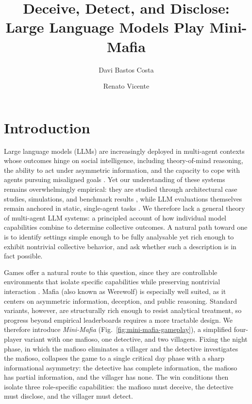\documentclass[sigconf,anonymous,balance=false]{aamas}
\title{Deceive, Detect, and Disclose: \\ Large Language Models Play Mini-Mafia}
\author{Davi Bastos Costa}
\author{Renato Vicente}
\affiliation{%
  \institution{Center for Artificial Intelligence and Machine Learning, IME, University of S\~ao Paulo}
  \city{S\~ao Paulo}
  \country{Brazil}}
\begin{document}

\maketitle

\section{Introduction}

Large language models (LLMs) are increasingly deployed in multi-agent contexts whose outcomes hinge on social intelligence, including theory-of-mind reasoning, the ability to act under asymmetric information, and the capacity to cope with agents pursuing misaligned goals \citep{gao2024large, guo2024large, wang2024survey}. Yet our understanding of these systems remains overwhelmingly empirical: they are studied through architectural case studies, simulations, and benchmark results \citep{hou2024egosocialarena}, while LLM evaluations themselves remain anchored in static, single-agent tasks \citep{costa2025moralsusceptibilityrobustnesspersona, banerjee2024vulnerability, pan2025benchmarks}. We therefore lack a general theory of multi-agent LLM systems: a principled account of how individual model capabilities combine to determine collective outcomes. A natural path toward one is to identify settings simple enough to be fully analysable yet rich enough to exhibit nontrivial collective behavior, and ask whether such a description is in fact possible.

Games offer a natural route to this question, since they are controllable environments that isolate specific capabilities while preserving nontrivial interaction \citep{silver2016mastering, huizinga1938homo}. Mafia (also known as Werewolf) is especially well suited, as it centers on asymmetric information, deception, and public reasoning. Standard variants, however, are structurally rich enough to resist analytical treatment, so progress beyond empirical leaderboards requires a more tractable design.
We therefore introduce \textit{Mini-Mafia} (Fig.~\ref{fig:mini-mafia-gameplay}), a simplified four-player variant with one mafioso, one detective, and two villagers. Fixing the night phase, in which the mafioso eliminates a villager and the detective investigates the mafioso, collapses the game to a single critical day phase with a sharp informational asymmetry: the detective has complete information, the mafioso has partial information, and the villager has none. The win conditions then isolate three role-specific capabilities: the mafioso must deceive, the detective must disclose, and the villager must detect.
\end{document}
